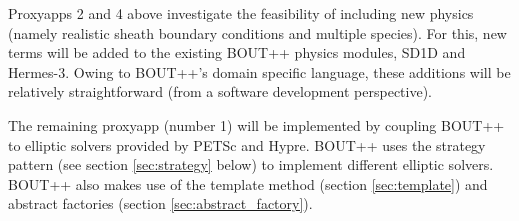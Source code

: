 Proxyapps 2 and 4 above investigate the feasibility of including new physics
(namely realistic sheath boundary conditions and multiple species). 
For this, new terms will be added to the existing BOUT++ physics modules, SD1D
and Hermes-3.
Owing to BOUT++'s domain specific language, these additions will be relatively
straightforward (from a software development perspective).

The remaining proxyapp (number 1) will be implemented by coupling BOUT++ to
elliptic solvers provided by PETSc and Hypre.
BOUT++ uses the strategy pattern (see section \ref{sec:strategy} below) to implement different elliptic solvers.
BOUT++ also makes use of the template method (section \ref{sec:template}) and abstract factories (section \ref{sec:abstract_factory}).

